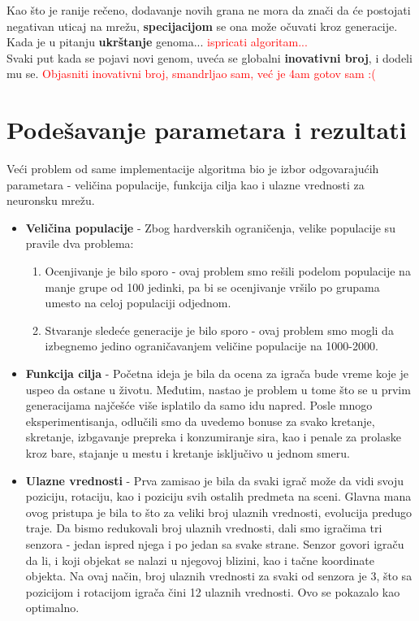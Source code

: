 \documentclass[a4paper]{article}
\begin{document}
Kao što je ranije rečeno, dodavanje novih grana ne mora da znači da će postojati negativan uticaj na mrežu, \textbf{specijacijom} se ona može očuvati kroz generacije. \\

Kada je u pitanju \textbf{ukrštanje} genoma... \textcolor{red}{ispricati algoritam...} \\

Svaki put kada se pojavi novi genom, uveća se globalni \textbf{inovativni broj}, i dodeli mu se.
\textcolor{red}{Objasniti inovativni broj, smandrljao sam, već je 4am gotov sam :(}

\section{Podešavanje parametara i rezultati}
\label{podesavanje}

Veći problem od same implementacije algoritma bio je izbor odgovarajućih parametara - veličina populacije, funkcija cilja kao i ulazne vrednosti za neuronsku mrežu. 

\begin{itemize}

\item \textbf{Veličina populacije} - Zbog hardverskih ograničenja, velike populacije su pravile dva problema:
\begin{enumerate}
\item Ocenjivanje je bilo sporo - ovaj problem smo rešili podelom populacije na manje grupe od 100 jedinki, pa bi se ocenjivanje vršilo po grupama umesto na celoj populaciji odjednom.
\item Stvaranje sledeće generacije je bilo sporo - ovaj problem smo mogli da izbegnemo jedino ograničavanjem veličine populacije na 1000-2000.
\end{enumerate}


\item \textbf{Funkcija cilja} - Početna ideja je bila da ocena za igrača bude vreme koje je uspeo da ostane u životu. Međutim, nastao je problem u tome što se u prvim generacijama najčešće više isplatilo da samo idu napred. Posle mnogo eksperimentisanja, odlučili smo da uvedemo bonuse za svako kretanje, skretanje, izbgavanje prepreka i konzumiranje sira, kao i penale za prolaske kroz bare, stajanje u mestu i kretanje isključivo u jednom smeru.

\item \textbf{Ulazne vrednosti} - Prva zamisao je bila da svaki igrač može da vidi svoju poziciju, rotaciju, kao i poziciju svih ostalih predmeta na sceni. Glavna mana ovog pristupa je bila to što za veliki broj ulaznih vrednosti, evolucija predugo traje. Da bismo redukovali broj ulaznih vrednosti, dali smo igračima tri senzora - jedan ispred njega i po jedan sa svake strane. Senzor govori igraču da li, i koji objekat se nalazi u njegovoj blizini, kao i tačne koordinate objekta. Na ovaj način, broj ulaznih vrednosti za svaki od senzora je 3, što sa pozicijom i rotacijom igrača čini 12 ulaznih vrednosti. Ovo se pokazalo kao optimalno.

\end{itemize}
\end{document}
